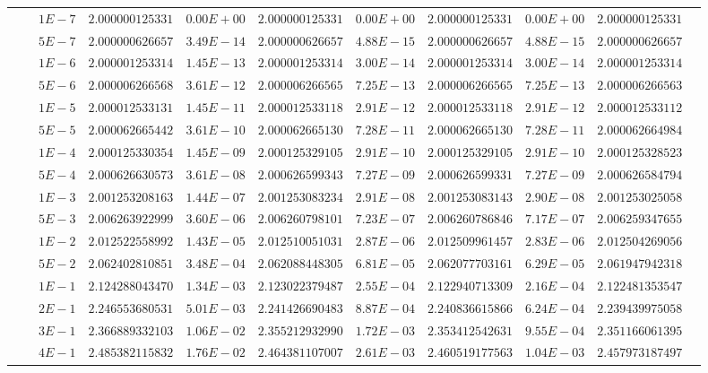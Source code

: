 \begin{landscape}
\begin{table}[ht]
{\begin{tabular}[c]{c|c|c|c|c|c|c|c|c|c|c}
& &$1E-7$ & $2.000000125331$ & $0.00E+00$ & $2.000000125331$ & $0.00E+00$ & $2.000000125331$ & $0.00E+00$ & $2.000000125331$ & \\
& &$5E-7$ & $2.000000626657$ & $3.49E-14$ & $2.000000626657$ & $4.88E-15$ & $2.000000626657$ & $4.88E-15$ & $2.000000626657$ & \\
& &$1E-6$ & $2.000001253314$ & $1.45E-13$ & $2.000001253314$ & $3.00E-14$ & $2.000001253314$ & $3.00E-14$ & $2.000001253314$ & \\
& &$5E-6$ & $2.000006266568$ & $3.61E-12$ & $2.000006266565$ & $7.25E-13$ & $2.000006266565$ & $7.25E-13$ & $2.000006266563$ & \\
& &$1E-5$ & $2.000012533131$ & $1.45E-11$ & $2.000012533118$ & $2.91E-12$ & $2.000012533118$ & $2.91E-12$ & $2.000012533112$ & \\
& &$5E-5$ & $2.000062665442$ & $3.61E-10$ & $2.000062665130$ & $7.28E-11$ & $2.000062665130$ & $7.28E-11$ & $2.000062664984$ & \\
& &$1E-4$ & $2.000125330354$ & $1.45E-09$ & $2.000125329105$ & $2.91E-10$ & $2.000125329105$ & $2.91E-10$ & $2.000125328523$ & \\
& &$5E-4$ & $2.000626630573$ & $3.61E-08$ & $2.000626599343$ & $7.27E-09$ & $2.000626599331$ & $7.27E-09$ & $2.000626584794$ & \\
& &$1E-3$ & $2.001253208163$ & $1.44E-07$ & $2.001253083234$ & $2.91E-08$ & $2.001253083143$ & $2.90E-08$ & $2.001253025058$ & \\
& &$5E-3$ & $2.006263922999$ & $3.60E-06$ & $2.006260798101$ & $7.23E-07$ & $2.006260786846$ & $7.17E-07$ & $2.006259347655$ & \\
& &$1E-2$ & $2.012522558992$ & $1.43E-05$ & $2.012510051031$ & $2.87E-06$ & $2.012509961457$ & $2.83E-06$ & $2.012504269056$ & \\
& &$5E-2$ & $2.062402810851$ & $3.48E-04$ & $2.062088448305$ & $6.81E-05$ & $2.062077703161$ & $6.29E-05$ & $2.061947942318$ & \\
& &$1E-1$ & $2.124288043470$ & $1.34E-03$ & $2.123022379487$ & $2.55E-04$ & $2.122940713309$ & $2.16E-04$ & $2.122481353547$ & \\
& &$2E-1$ & $2.246553680531$ & $5.01E-03$ & $2.241426690483$ & $8.87E-04$ & $2.240836615866$ & $6.24E-04$ & $2.239439975058$ & \\
& &$3E-1$ & $2.366889332103$ & $1.06E-02$ & $2.355212932990$ & $1.72E-03$ & $2.353412542631$ & $9.55E-04$ & $2.351166061395$ & \\
& &$4E-1$ & $2.485382115832$ & $1.76E-02$ & $2.464381107007$ & $2.61E-03$ & $2.460519177563$ & $1.04E-03$ & $2.457973187497$ & \\

\end{tabular}}
\end{table}
\end{landscape}
